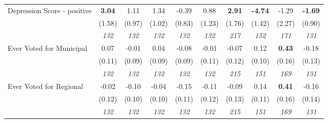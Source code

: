 \begin{tabular}{l c c c c c c c c c}
Depression Score - positive & \textbf{ 3.04 } & 1.11 & 1.34 & -0.39 & 0.88 & \textbf{ 2.91 } & \textbf{-4.74} & -1.29 & \textbf{-1.69} \\
& (1.58) & (0.97) & (1.02) & (0.83) & (1.23) & (1.76) & (1.42) & (2.27) & (0.90) \\
& \textit{ 132 } & \textit{ 132 } & \textit{ 132 } & \textit{ 132 } & \textit{ 132 } & \textit{ 217 } & \textit{ 152 } & \textit{ 171 } & \textit{ 131 } \\
Ever Voted for Municipal & 0.07 & -0.01 & 0.04 & -0.08 & -0.01 & -0.07 & 0.12 & \textbf{ 0.43 } & -0.18 \\
& (0.11) & (0.09) & (0.09) & (0.09) & (0.11) & (0.12) & (0.10) & (0.16) & (0.13) \\
& \textit{ 132 } & \textit{ 132 } & \textit{ 132 } & \textit{ 132 } & \textit{ 132 } & \textit{ 215 } & \textit{ 151 } & \textit{ 169 } & \textit{ 131 } \\
Ever Voted for Regional & -0.02 & -0.10 & -0.04 & -0.15 & -0.11 & -0.09 & 0.14 & \textbf{ 0.41 } & -0.16 \\
& (0.12) & (0.10) & (0.10) & (0.11) & (0.12) & (0.13) & (0.11) & (0.16) & (0.14) \\
& \textit{ 132 } & \textit{ 132 } & \textit{ 132 } & \textit{ 132 } & \textit{ 132 } & \textit{ 215 } & \textit{ 151 } & \textit{ 169 } & \textit{ 131 } \\
\bottomrule
\end{tabular}

